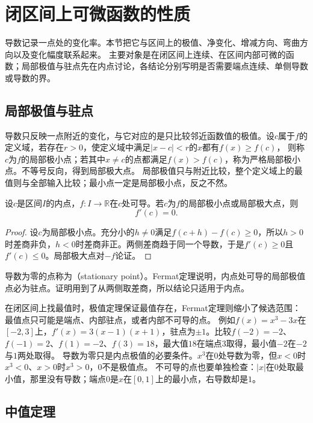 \section{闭区间上可微函数的性质}
\label{sec:ru-interval-differentiable}

导数记录一点处的变化率。本节把它与区间上的极值、净变化、增减方向、弯曲方向以及变化幅度联系起来。
主要对象是在闭区间上连续、在区间内部可微的函数；局部极值与驻点先在内点讨论，各结论分别写明是否需要端点连续、单侧导数或导数的界。

\subsection{局部极值与驻点}
\label{sec:ru-local-extrema}

导数只反映一点附近的变化，与它对应的是只比较邻近函数值的极值。设$c$属于$f$的定义域，若存在$r>0$，使定义域中满足$|x-c|<r$的$x$都有$f(x)\geq f(c)$，
则称$c$为$f$的局部极小点；若其中$x\neq c$的点都满足$f(x)>f(c)$，称为严格局部极小点。不等号反向，得到局部极大点。
局部极值只与附近比较，整个定义域上的最值则与全部输入比较；最小点一定是局部极小点，反之不然。
\begin{theorem}[Fermat定理]
\label{thm:analysis-fermat}
设$c$是区间$I$的内点，$f:I\to\mathbb R$在$c$处可导。若$c$为$f$的局部极小点或局部极大点，则
\begin{equation}
 f'(c)=0.
 \label{eq:analysis-scalar-first-order-necessary}
\end{equation}
\end{theorem}
\begin{proof}
设$c$为局部极小点。充分小的$h\neq0$满足$f(c+h)-f(c)\geq0$，所以$h>0$时差商非负，$h<0$时差商非正。两侧差商趋于同一个导数，于是$f'(c)\geq0$且$f'(c)\leq0$。局部极大点对$-f$论证。
\end{proof}
导数为零的点称为（stationary point）。Fermat定理说明，内点处可导的局部极值点必为驻点。证明用到了从两侧取差商，所以结论只适用于内点。

在闭区间上找最值时，极值定理保证最值存在，Fermat定理则缩小了候选范围：最值点只可能是端点、内部驻点，或者内部不可导的点。
例如$f(x)=x^3-3x$在$[-2,3]$上，$f'(x)=3(x-1)(x+1)$，驻点为$\pm1$。比较$f(-2)=-2$、$f(-1)=2$、$f(1)=-2$、$f(3)=18$，最大值$18$在端点$3$取得，最小值$-2$在$-2$与$1$两处取得。
导数为零只是内点极值的必要条件。$x^3$在$0$处导数为零，但$x<0$时$x^3<0$、$x>0$时$x^3>0$，$0$不是极值点。
不可导的点也要单独检查：$|x|$在$0$处取最小值，那里没有导数；端点$0$是$x$在$[0,1]$上的最小点，右导数却是$1$。

\subsection{中值定理}
\label{sec:ru-mean-value-theorems}

